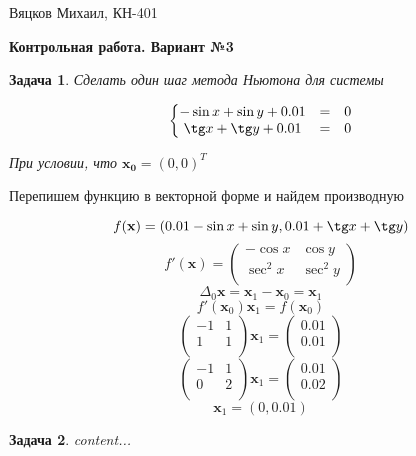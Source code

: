 \documentclass[11pt,a4paper,oneside]{article}
\begin{document}
	
\newtheorem{problem}{Задача}

\begin{center}
	{Вяцков Михаил, КН-401}
	
	{\huge \bf Контрольная работа. Вариант №3 }
\end{center}

\begin{problem}
Сделать один шаг метода Ньютона для системы

$$ \left\{\begin{matrix}
	-\sin x + \sin y + 0.01 & = & 0 \\
	\tg x + \tg y + 0.01 & = & 0 \\
\end{matrix}\right. $$
	
При условии, что $\mathbf{x_0} = (0, 0)^T$	
\end{problem}

Перепишем функцию в векторной форме и найдем производную

$$ f(\mathbf{x}) = (0.01 - \sin x + \sin y, 0.01 + \tg x + \tg y) $$
$$ f'(\mathbf{x}) = \left(\begin{matrix}
	- \cos x & \cos y \\
	\sec^2 x & \sec^2 y \\
\end{matrix}\right) $$
$$ \varDelta_0 \mathbf{x} = \mathbf{x}_1 - \mathbf{x}_0 = \mathbf{x}_1 $$
$$ f'(\mathbf{x}_0) \mathbf{x}_1 = f(\mathbf{x}_0) $$
$$ \left(\begin{matrix}
	 -1 & 1 \\
	 1 & 1 \\
\end{matrix}\right) \mathbf{x}_1 =
\left(\begin{matrix}
	0.01 \\
	0.01 \\
\end{matrix}\right) $$
$$ \left(\begin{matrix}
	-1 & 1 \\
	0 & 2 \\
\end{matrix}\right) \mathbf{x}_1 =
\left(\begin{matrix}
	0.01 \\
	0.02 \\
\end{matrix}\right) $$
$$ \mathbf{x}_1 = (0, 0.01) $$

\begin{problem}
	content...
\end{problem}
\end{document}
